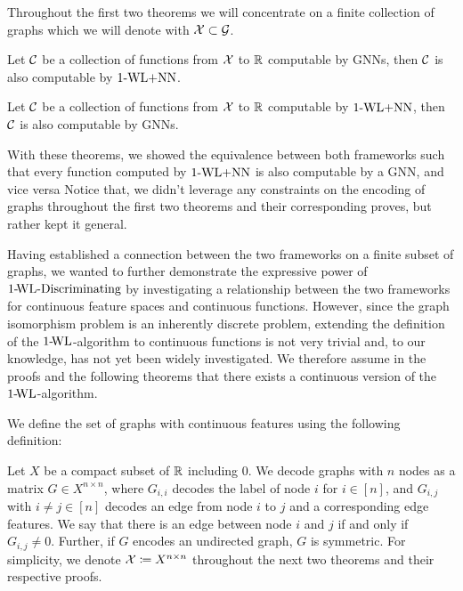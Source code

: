Throughout the first two theorems we will concentrate on a finite collection of graphs which we will denote with $\mathcal{X} \subset \mathcal{G}$.

\begin{theorem}\label{theorem:1wl_in_gnn}
    Let $\mathcal{C}$ be a collection of functions from $\mathcal{X}$ to $\mathbb{R}$ computable by GNNs, then $\mathcal{C}$ is also computable by $\text{1-WL+NN}$.
\end{theorem}

\begin{theorem}\label{theorem:gnn_in_1wl}
    Let $\mathcal{C}$ be a collection of functions from $\mathcal{X}$ to $\mathbb{R}$ computable by $\text{1-WL+NN}$, then $\mathcal{C}$ is also computable by GNNs.
\end{theorem}
With these theorems, we showed the equivalence between both frameworks such that every function computed by $\text{1-WL+NN}$ is also computable by a GNN, and vice versa Notice that, we didn't leverage any constraints on the encoding of graphs throughout the first two theorems and their corresponding proves, but rather kept it general. 

Having established a connection between the two frameworks on a finite subset of graphs, we wanted to further demonstrate the expressive power of $\text{1-\!WL-Discriminating}$ by investigating a relationship between the two frameworks for continuous feature spaces and continuous functions. However, since the graph isomorphism problem is an inherently discrete problem, extending the definition of the $\text{1-\!WL}$-algorithm to continuous functions is not very trivial and, to our knowledge, has not yet been widely investigated. We therefore assume in the proofs and the following theorems that there exists a continuous version of the $\text{1-\!WL}$-algorithm. 

We define the set of graphs with continuous features using the following definition:
\begin{definition}
    Let $X$ be a compact subset of $\mathbb{R}$ including $0$. We decode graphs with $n$ nodes as a matrix $G \in X^{n \times n}$, where $G_{i,i}$ decodes the label of node $i$ for $i \in [n]$, and $G_{i,j}$ with $i \neq j \in [n]$ decodes an edge from node $i$ to $j$ and a corresponding edge features. We say that there is an edge between node $i$ and $j$ if and only if $G_{i,j} \neq 0$. Further, if $G$ encodes an undirected graph, $G$ is symmetric. For simplicity, we denote $\mathcal{X} \coloneqq X^{n \times n}$ throughout the next two theorems and their respective proofs.
\end{definition}

